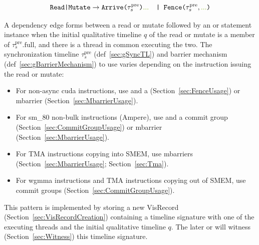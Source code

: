 
\begin{equation*}
    \texttt{Read|Mutate} \to \texttt{Arrive(}\tau_s^\mathrm{pre}\texttt{)\codecomment{...} | Fence(}\tau_s^\mathrm{pre},\codecomment{...}\texttt{)}
\end{equation*}

A dependency edge forms between a read or mutate followed by an  or  statement instance when the initial qualitative timeline $q$ of the read or mutate is a member of $\tau_s^\mathrm{pre}.\mathrm{full}$, and there is a thread in common executing the two.
The synchronization timeline $\tau_s^\mathrm{pre}$ (def~\ref{sec:gSyncTL}) and barrier mechanism (def~\ref{sec:gBarrierMechanism}) to use varies depending on the instruction issuing the read or mutate:
\begin{itemize}
  \item For non-async cuda instructions, use  and a  (Section~\ref{sec:FenceUsage}) or mbarrier (Section~\ref{sec:MbarrierUsage}).
  \item For sm\_80 non-bulk  instructions (Ampere), use  and a commit group (Section~\ref{sec:CommitGroupUsage}) or mbarrier (Section~\ref{sec:MbarrierUsage}).
  \item For TMA instructions copying into SMEM, use mbarriers (Section~\ref{sec:MbarrierUsage}; Section~\ref{sec:Tma}).
  \item For wgmma instructions and TMA instructions copying out of SMEM, use commit groups (Section~\ref{sec:CommitGroupUsage}).
\end{itemize}
This pattern is implemented by storing a new \textsf{VisRecord} (Section~\ref{sec:VisRecordCreation}) containing a timeline signature with one of the executing threads and the initial qualitative timeline $q$.
The later  or  will witness (Section~\ref{sec:Witness}) this timeline signature.

